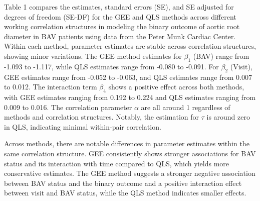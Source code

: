 \documentclass[
]{aft}
\begin{document}
Table 1 compares the estimates, standard errors (SE), and SE adjusted
for degrees of freedom (SE-DF) for the GEE and QLS methods across
different working correlation structures in modeling the binary outcome
of aortic root diameter in BAV patients using data from the Peter Munk
Cardiac Center. Within each method, parameter estimates are stable
across correlation structures, showing minor variations. The GEE method
estimates for \(\beta_1\) (BAV) range from -1.093 to -1.117, while QLS
estimates range from -0.080 to -0.091. For \(\beta_2\) (Visit), GEE
estimates range from -0.052 to -0.063, and QLS estimates range from
0.007 to 0.012. The interaction term \(\beta_4\) shows a positive effect
across both methods, with GEE estimates ranging from 0.192 to 0.224 and
QLS estimates ranging from 0.009 to 0.016. The correlation parameter
\(\alpha\) are all around 1 regardless of methods and correlation
structures. Notably, the estimation for \(\tau\) is around zero in QLS,
indicating minimal within-pair correlation.

Across methods, there are notable differences in parameter estimates
within the same correlation structure. GEE consistently shows stronger
associations for BAV status and its interaction with time compared to
QLS, which yields more conservative estimates. The GEE method suggests a
stronger negative association between BAV status and the binary outcome
and a positive interaction effect between visit and BAV status, while
the QLS method indicates smaller effects.
\end{document}
